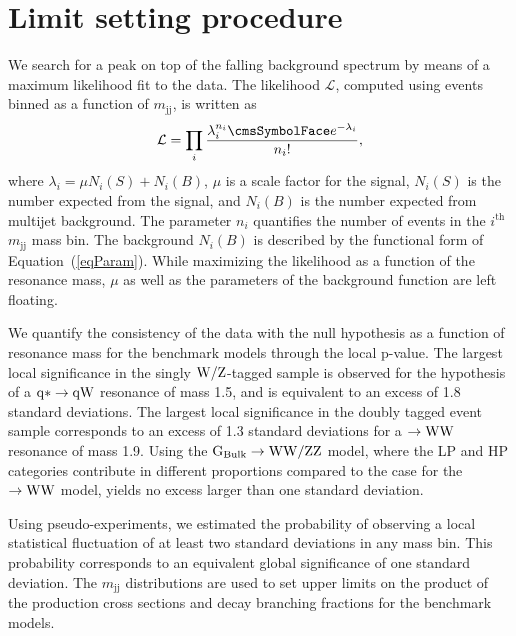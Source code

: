 \newpage
\section{Limit setting procedure}
\label{sec:statistics}



We search for a peak on top of the falling background spectrum by
means of a maximum likelihood fit to the data. The likelihood $\mathcal{L}$, computed using events binned as a function of $m_\mathrm{jj}$,
is written as
\begin{equation} \mathcal{L} = \prod_{i}
  \frac{\lambda_{i}^{n_{i}}\re^{-\lambda_{i}}}{n_{i}!},
\end{equation}
where ${\lambda_{i}} = {\mu}{N_{i}(S)} + {N_{i}(B)}$,
$\mu$ is a scale factor for the signal, $N_i(S)$ is the number
expected from the signal, and $N_i(B)$ is the number expected from
multijet background. The parameter $n_i$ quantifies the number of
events in the $i^\mathrm{th}$ $m_\mathrm{jj}$ mass bin.
The background $N_i(B)$ is described by the functional form of
Equation~(\ref{eqParam}). While maximizing the likelihood as a function of
the resonance mass, $\mu$ as well as the parameters of the background
function are left floating.


We quantify the consistency of the data with the null hypothesis as a
function of resonance mass for the benchmark models through the local
p-value. The largest local significance in the singly
${\rm W}/{\rm Z}$-tagged sample is observed for the hypothesis of a ${\rm q*
\to q{\rm W}}$ resonance of mass 1.5\TeVcc, and is equivalent to an excess
of 1.8 standard deviations. The largest local significance in the
doubly tagged event sample corresponds to an excess of 1.3 standard
deviations for a  \GRS$\to{\rm W}{\rm W}$ resonance of mass 1.9\TeVcc. Using the
${\rm G_\mathrm{Bulk}\to{\rm W}{\rm W}/{\rm Z}{\rm Z}}$ model, where the LP and HP categories
contribute in different proportions compared to the case for the
\GRS$\to{\rm W}{\rm W}$ model, yields no excess larger than one standard
deviation. 

Using pseudo-experiments, we estimated the probability of observing a
local statistical fluctuation of at least two standard deviations in
any mass bin. This probability corresponds to an equivalent global
significance of one standard deviation.  The $m_\mathrm{jj}$ distributions
are used to set upper limits on the product of the production cross
sections and decay branching fractions for the benchmark models.